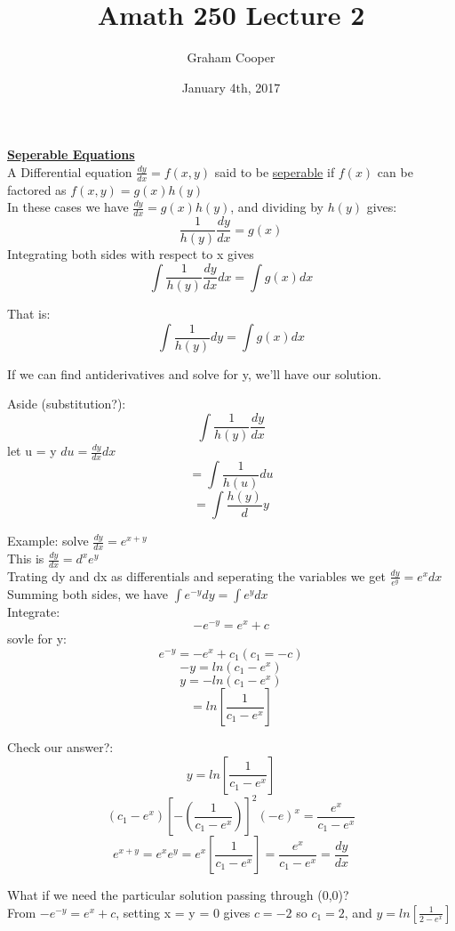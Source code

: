 \documentclass[12pt]{article}
\title{\vspace{-15ex}Amath 250 Lecture 2\vspace{-1ex}}
\date{January 4th, 2017}
\author{Graham Cooper}
\newcommand{\myt}[1]{\textbf{\underline{#1}}}
\begin{document}
	\maketitle
	
	\myt{Seperable Equations}\\
	
	A Differential equation $\frac{dy}{dx} = f(x,y)$ said to be \underline{seperable} if $f(x)$ can be factored as $f(x,y) = g(x)h(y)$\\
	
	In these cases we have $\frac{dy}{dx} = g(x)h(y)$, and dividing by $h(y)$ gives:\\ $$\frac{1}{h(y)}\frac{dy}{dx} = g(x)$$
	Integrating both sides with respect to x gives\\
	$$\int \frac{1}{h(y)} \frac{dy}{dx}dx = \int g(x)dx$$
	
	That is:\\
	
	$$\int \frac{1}{h(y)}dy = \int g(x)dx$$
	
	If we can find antiderivatives and solve for y, we'll have our solution.
		
	Aside (substitution?):\\
	
	$$\int \frac{1}{h(y)}\frac{dy}{dx}$$
	let u = y $du = \frac{dy}{dx}dx$\\
	$$= \int \frac{1}{h(u)}du$$
	$$= \int \frac{h(y)}dy$$
	
	Example: solve $\frac{dy}{dx} = e^{x+y}$\\
	
	This is $\frac{dy}{dx} = d^xe^y$\\
	Trating dy and dx as differentials and seperating the variables we get $\frac{dy}{e^y} = e^xdx$\\
	Summing both sides, we have $\int e^{-y}dy = \int e^ydx$\\
	
	Integrate:\\
	$$-e^{-y} = e^x + c$$
	sovle for y:\\
	$$e^{-y} = -e^x + c_1 (c_1 = -c)$$
	$$-y = ln(c_1 - e^x)$$
	$$y = -ln(c_1 - e^x)$$
	$$= ln[\frac{1}{c_1 - e^x}]$$
	
	Check our answer?:\\
	$$y = ln[\frac{1}{c_1 - e^x}]$$
	$$(c_1 - e^x)[-(\frac{1}{c_1 - e^x})]^2(-e)^x = \frac{e^x}{c_1 - e^x}$$
	$$e^{x+y} = e^xe^y = e^x[\frac{1}{c_1-e^x}] = \frac{e^x}{c_1 - e^x} = \frac{dy}{dx}$$
	
	What if we need the particular solution passing through (0,0)?\\
	From $-e^{-y} = e^x + c$, setting x = y = 0 gives $c = -2$ so $c_1 = 2$, and $y = ln[\frac{1}{2-e^x}]$
	
\end{document}
